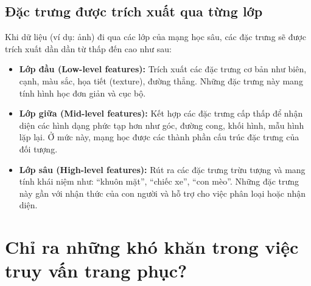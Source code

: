 \documentclass[12pt]{article}
\begin{document}
	\subsection{Đặc trưng được trích xuất qua từng lớp}
	
	Khi dữ liệu (ví dụ: ảnh) đi qua các lớp của mạng học sâu, các đặc trưng sẽ được trích xuất dần dần từ thấp đến cao như sau:
	
	\begin{itemize}
	\item \textbf{Lớp đầu (Low-level features):} 
	Trích xuất các đặc trưng cơ bản như biên, cạnh, màu sắc, họa tiết (texture), đường thẳng. Những đặc trưng này mang tính hình học đơn giản và cục bộ.
	
	\item \textbf{Lớp giữa (Mid-level features):} 
	Kết hợp các đặc trưng cấp thấp để nhận diện các hình dạng phức tạp hơn như góc, đường cong, khối hình, mẫu hình lặp lại. Ở mức này, mạng học được các thành phần cấu trúc đặc trưng của đối tượng.
	
	\item \textbf{Lớp sâu (High-level features):} 
	Rút ra các đặc trưng trừu tượng và mang tính khái niệm như: ``khuôn mặt'', ``chiếc xe'', ``con mèo''. Những đặc trưng này gần với nhận thức của con người và hỗ trợ cho việc phân loại hoặc nhận diện.
	
	\end{itemize}
	
	\section{Chỉ ra những khó khăn trong việc truy vấn trang phục?}
	
\end{document}
